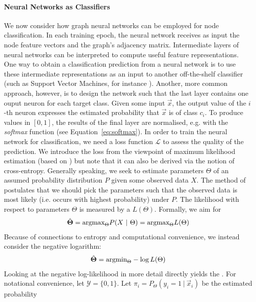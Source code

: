 \documentclass[
	fontsize=10pt, %
	twoside=false, %
	secnumdepth=1, %
  toc=indentunnumbered %
]{kaobook}
\begin{document}
\paragraph{Neural Networks as Classifiers} We now consider how graph neural
networks can be employed for node classification. In each training epoch, the
neural network receives as input the node feature vectors and the graph's
adjacency matrix.
%
Intermediate layers of neural
networks can be interpreted to compute useful feature representations. One way
to obtain a classification prediction from a neural network is to use these
intermediate representations as an input to another off-the-shelf classifier
(such as Support Vector Machines, for instance
\cite{liu_CombiningConvolutionalNeural_2018}). Another, more common approach,
however, is to design the network such that the last layer contains one ouput
neuron for each target class. Given some input $\vec x$, the output value of the
$i$-th neuron expresses the estimated probability that $\vec x$ is of class
$c_i$. To produce values in $[0,1]$, the results of the final layer are
normalised, e.g. with the \textit{softmax} function (see Equation~\ref{eq:softmax}).
%
In order to train the neural network for classification, we need a loss function
$\mathcal{L}$ to assess the quality of the prediction. We introduce the
 loss from the viewpoint of maximum likelihood
estimation (based on \cite{zhang_dive_nodate}) but note that it can also be
derived via the notion of cross-entropy.
%
Generally speaking, we seek to estimate parameters $\Theta$ of an assumed
probability distribution $P$ given some observed data $X$. The method of
 postulates that we should pick the
parameters such that the observed data is most likely (i.e. occurs with highest
probability) under $P$. The likelihood with respect to parameters $\Theta$ is measured by
a  $L(\Theta)$.
Formally, we aim for
\begin{align}
  \hat \Theta = \argmax_\Theta P(X~|~\Theta) = \argmax_\Theta L(\Theta)
\end{align}
Because of connections to entropy and computational convenience, we instead
consider the negative logarithm:
\begin{align}
  \hat \Theta = \argmin_\Theta -\log L(\Theta)
\end{align}
Looking at the negative log-likelihood in more detail directly yields the
.
For notational convenience, let $\mathcal{Y} =
\{0,1\}$. Let $\pi_i = P_\Theta(y_i=1~|~\vec x_i)$ be the estimated probability
\end{document}
